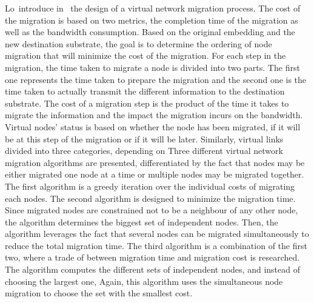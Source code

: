 Lo~\etal introduce in~\cite{vnm-lo2013} the design of a virtual network migration process.
The cost of the migration is based on two metrics, the completion time of the migration as well as the bandwidth consumption.
Based on the original embedding and the new destination substrate, the goal is to determine the ordering of node migration that will minimize the cost of the migration.
For each step in the migration, the time taken to migrate a node is divided into two parts. The first one represents the time taken to prepare the migration and the second one is the time taken to actually transmit the different information to the destination substrate.
The cost of a migration step is the product of the time it takes to migrate the information and the impact the migration incurs on the bandwidth.
Virtual nodes' status is based on whether the node has been migrated, if it will be at this step of the migration or if it will be later.
Similarly, virtual links divided into three categories, depending on 
Three different virtual network migration algorithms are presented, differentiated by the fact that nodes may be either migrated one node at a time or multiple nodes may be migrated together.
The first algorithm is a greedy iteration over the individual costs of migrating each nodes.
The second algorithm is designed to minimize the migration time. Since migrated nodes are constrained not to be a neighbour of any other node, the algorithm determines the biggest set of independent nodes.
Then, the algorithm leverages the fact that several nodes can be migrated simultaneously to reduce the total migration time.
The third algorithm is a combination of the first two, where a trade of between migration time and migration cost is researched. The algorithm computes the different sets of independent nodes, and instead of choosing the largest one, Again, this algorithm uses the simultaneous node migration to choose the set with the smallest cost.

